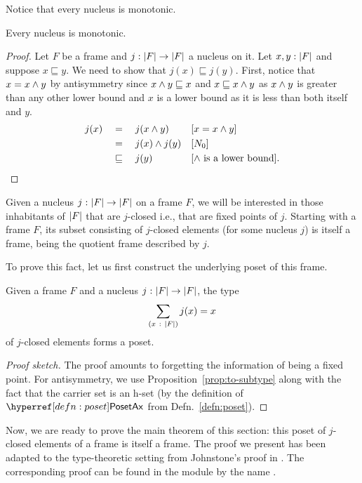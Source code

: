 Notice that every nucleus is monotonic.
\begin{prop}\label{prop:nucleus-mono}
  Every nucleus is monotonic.
\end{prop}
\begin{proof}
  Let $F$ be a frame and $j : \left| F \right| \rightarrow \left| F \right|$ a nucleus on it. Let
  $x, y:\left| F \right|$ and suppose $x \sqsubseteq y$. We need to show that $j(x) \sqsubseteq j(y)$. First,
  notice that $x = x \wedge y$ by antisymmetry since $x \wedge y \sqsubseteq x$ and $x \sqsubseteq
  x \wedge y$ as $x \wedge y$ is greater than any other lower bound and $x$ is a lower
  bound as it is less than both itself and $y$.
  \begin{align*}
    j(x) &\quad=\quad j(x \wedge y)                 && [x = x \wedge y]                      \\
         &\quad=\quad j(x) \wedge j(y)              && [N_0]                                  \\
         &\quad\sqsubseteq\quad {j(y)}                         && [\text{$\wedge$ is a lower bound}]  .
  \end{align*}
\end{proof}

Given a nucleus $j\hspace{0.1mm}:\hspace{0.1mm}\left| F \right| \rightarrow \left| F \right|$ on a frame $F$, we will be interested in
those inhabitants of $\left| F \right|$ that are $j$-closed i.e., that are fixed points of $j$.
Starting with a frame $F$, its subset consisting of $j$-closed elements (for some nucleus
$j$) is itself a frame, being the quotient frame described by $j$.

To prove this fact, let us first construct the underlying poset of this frame.
\begin{prop}
  Given a frame $F$ and a nucleus $j\hspace{0.1mm}:\hspace{0.1mm}\left| F \right| \rightarrow \left| F \right|$, the type
  \[\sum_{(x~:~\left| F \right|)} j(x) = x\] of $j$-closed elements forms a poset.
\end{prop}
\begin{proof}[Proof sketch]
  The proof amounts to forgetting the information of being a fixed point. For
  antisymmetry, we use Proposition~\ref{prop:to-subtype} along with the fact that the
  carrier set is an h-set (by the definition of $\posetaxnm{}$ from
  Defn.~\ref{defn:poset}).
\end{proof}

Now, we are ready to prove the main theorem of this section: this poset of $j$-closed
elements of a frame is itself a frame. The proof we present has been adapted to the
type-theoretic setting from Johnstone's proof in \cite[II.2.2, pg.~49]{stone-spaces}. The
corresponding \veragda{} proof can be found in the  module by the name
.

